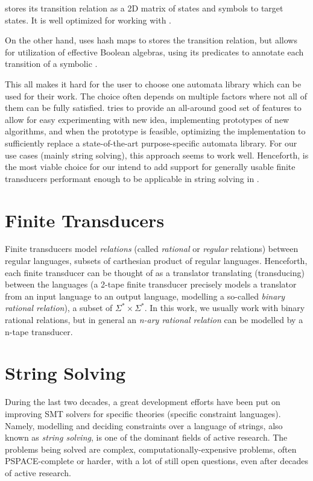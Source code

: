 \automatajar stores its transition relation as a 2D matrix of states and symbols to target states.
It is well optimized for working with \dfas.

On the other hand, \automatanet uses hash maps to stores the transition relation, but allows for utilization of effective Boolean algebras, using its predicates to annotate each transition of a symbolic \nfa.

This all makes it hard for the user to choose one automata library which can be used for their work.
The choice often depends on multiple factors where not all of them can be fully satisfied.
\mata tries to provide an all-around good set of features to allow for easy experimenting with new idea, implementing prototypes of new algorithms, and when the prototype is feasible, optimizing the implementation to sufficiently replace a state-of-the-art purpose-specific automata library.
For our use cases (mainly string solving), this approach seems to work well.
Henceforth, \mata is the most viable choice for our intend to add support for generally usable finite transducers performant enough to be applicable in string solving in \noodler.

\section{Finite Transducers}

Finite transducers model \emph{relations} (called \emph{rational} or \emph{regular} relations) between regular languages, subsets of carthesian product of regular languages.
Henceforth, each finite transducer can be thought of as a translator translating (transducing) between the languages (a 2-tape finite transducer precisely models a translator from an input language to an output language, modelling a so-called \emph{binary rational relation}), a subset of $\Sigma^* \times \Sigma^*$.
In this work, we usually work with binary rational relations, but in general an \emph{n-ary rational relation} can be modelled by a n-tape transducer.

\section{String Solving}

During the last two decades, a great development efforts have been put on improving SMT solvers for specific theories (specific constraint languages).
Namely, modelling and deciding constraints over a language of strings, also known as \emph{string solving}, is one of the dominant fields of active research.
The problems being solved are complex, computationally-expensive problems, often PSPACE-complete or harder, with a lot of still open questions, even after decades of active research.

